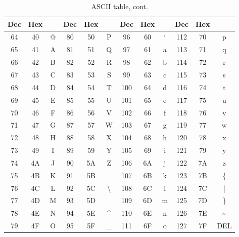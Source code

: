 
\begin{table}
  \begin{tabular}{|c|c|c||c|c|c||c|c|c||c|c|c|}                                                 \hline
    Dec & Hex &  & Dec & Hex &                & Dec & Hex  &  & Dec & Hex  &                 \\ \hline
    64 & 40 & @  & 80 & 50 & P                & 96 & 60  & `  & 112 & 70 & p                 \\
    65 & 41 & A  & 81 & 51 & Q                & 97 & 61  & a  & 113 & 71 & q                 \\
    66 & 42 & B  & 82 & 52 & R                & 98 & 62  & b  & 114 & 72 & r                 \\
    67 & 43 & C  & 83 & 53 & S                & 99 & 63  & c  & 115 & 73 & s                 \\
    68 & 44 & D  & 84 & 54 & T                & 100 & 64 & d  & 116 & 74 & t                 \\
    69 & 45 & E  & 85 & 55 & U                & 101 & 65 & e  & 117 & 75 & u                 \\
    70 & 46 & F  & 86 & 56 & V                & 102 & 66 & f  & 118 & 76 & v                 \\
    71 & 47 & G  & 87 & 57 & W                & 103 & 67 & g  & 119 & 77 & w                 \\
    72 & 48 & H  & 88 & 58 & X                & 104 & 68 & h  & 120 & 78 & x                 \\
    73 & 49 & I  & 89 & 59 & Y                & 105 & 69 & i  & 121 & 79 & y                 \\
    74 & 4A & J  & 90 & 5A & Z                & 106 & 6A & j  & 122 & 7A & z                 \\
    75 & 4B & K  & 91 & 5B & \lbrack{}        & 107 & 6B & k  & 123 & 7B & \{                \\
    76 & 4C & L  & 92 & 5C & \textbackslash{} & 108 & 6C & l  & 124 & 7C & |                 \\
    77 & 4D & M  & 93 & 5D & \rbrack{}        & 109 & 6D & m  & 125 & 7D & \}                \\
    78 & 4E & N  & 94 & 5E & \^{}             & 110 & 6E & n  & 126 & 7E & \textasciitilde{} \\
    79 & 4F & O  & 95 & 5F & \_               & 111 & 6F & o  & 127 & 7F & DEL               \\ \hline
  \end{tabular}
  \caption{ASCII table, cont.}
\end{table}
